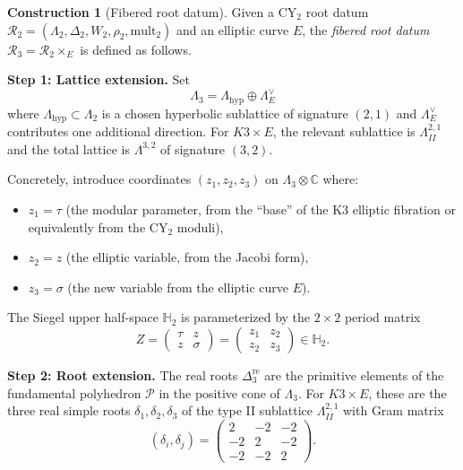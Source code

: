 \documentclass[11pt]{article}
\theoremstyle{plain}
\theoremstyle{definition}
\newtheorem{construction}[theorem]{Construction}
\theoremstyle{remark}
\newcommand{\CY}{\mathrm{CY}}
\newcommand{\cR}{\mathcal{R}}
\begin{document}
\begin{construction}[Fibered root datum]
\label{constr:fibered-root-datum}
Given a $\CY_2$ root datum
$\cR_2 = (\Lambda_2, \Delta_2, W_2, \rho_2, \mathrm{mult}_2)$
and an elliptic curve $E$, the \emph{fibered root datum}
$\cR_3 = \cR_2 \times_E$ is defined as follows.

\medskip
\noindent\textbf{Step 1: Lattice extension.} Set
\begin{equation}\label{eq:lattice-extension}
 \Lambda_3 = \Lambda_{\mathrm{hyp}} \oplus \Lambda_E^\vee
\end{equation}
where $\Lambda_{\mathrm{hyp}} \subset \Lambda_2$ is a chosen hyperbolic sublattice
of signature $(2,1)$ and $\Lambda_E^\vee$ contributes one additional direction.
For $K3 \times E$, the relevant sublattice is $\Lambda^{2,1}_{II}$ and the total
lattice is $\Lambda^{3,2}$ of signature $(3,2)$.

Concretely, introduce coordinates $(z_1, z_2, z_3)$ on $\Lambda_3 \otimes \mathbb{C}$
where:
\begin{itemize}
\item $z_1 = \tau$ (the modular parameter, from the ``base'' of the K3 elliptic
 fibration or equivalently from the $\CY_2$ moduli),
\item $z_2 = z$ (the elliptic variable, from the Jacobi form),
\item $z_3 = \sigma$ (the new variable from the elliptic curve $E$).
\end{itemize}
The Siegel upper half-space $\mathbb{H}_2$ is parameterized by the $2 \times 2$
period matrix
\[
 Z = \begin{pmatrix} \tau & z \\ z & \sigma \end{pmatrix}
 = \begin{pmatrix} z_1 & z_2 \\ z_2 & z_3 \end{pmatrix} \in \mathbb{H}_2.
\]

\medskip
\noindent\textbf{Step 2: Root extension.} The real roots $\Delta_3^{\mathrm{re}}$
are the primitive elements of the fundamental polyhedron $\mathcal{P}$ in the
positive cone of $\Lambda_3$. For $K3 \times E$, these are the three real simple
roots $\delta_1, \delta_2, \delta_3$ of the type II sublattice $\Lambda^{2,1}_{II}$
with Gram matrix
\[
 (\delta_i, \delta_j) = \begin{pmatrix} 2 & -2 & -2 \\ -2 & 2 & -2 \\ -2 & -2 & 2 \end{pmatrix}.
\]


\end{construction}
\end{document}
